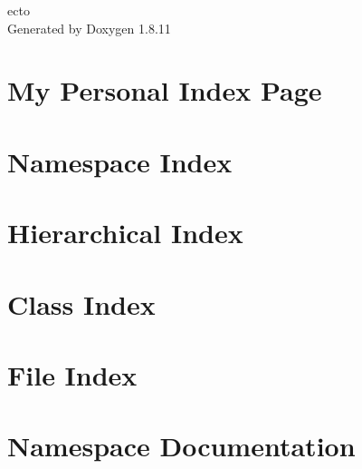 \documentclass[twoside]{book}
\newcommand{\+}{\discretionary{\mbox{\scriptsize$\hookleftarrow$}}{}{}}
\newcommand{\clearemptydoublepage}{%
  \newpage{\pagestyle{empty}\cleardoublepage}%
}
\begin{document}
\hypersetup{pageanchor=false,
             bookmarksnumbered=true,
             pdfencoding=unicode
            }
\begin{titlepage}
\vspace*{7cm}
\begin{center}%
{\Large ecto }\\
\vspace*{1cm}
{\large Generated by Doxygen 1.8.11}\\
\end{center}
\end{titlepage}
\clearemptydoublepage
\tableofcontents
\clearemptydoublepage
{}
\hypersetup{pageanchor=true}

\chapter{My Personal Index Page}
\label{index}\hypertarget{index}{}
\chapter{Namespace Index}

\chapter{Hierarchical Index}

\chapter{Class Index}

\chapter{File Index}

\chapter{Namespace Documentation}

















\end{document}
